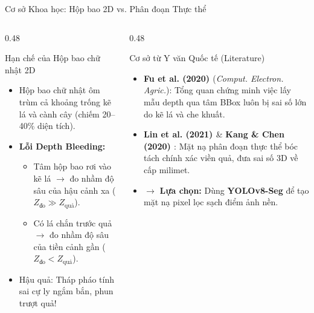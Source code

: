 \documentclass[aspectratio=169, 10pt]{beamer}
\begin{document}
\begin{frame}{Cơ sở Khoa học: Hộp bao 2D vs. Phân đoạn Thực thể}
\begin{columns}[T]
\begin{column}{0.48\textwidth}
    \begin{alertblock}{Hạn chế của Hộp bao chữ nhật 2D}
    \footnotesize
    \begin{itemize}
        \item Hộp bao chữ nhật ôm trùm cả khoảng trống kẽ lá và cành cây (chiếm 20--40\% diện tích).
        \item \textbf{Lỗi Depth Bleeding:} 
        \begin{itemize}
            \scriptsize
            \item Tâm hộp bao rơi vào kẽ lá $\rightarrow$ đo nhầm độ sâu của hậu cảnh xa ($Z_{\text{đo}} \gg Z_{\text{quả}}$).
            \item Có lá chắn trước quả $\rightarrow$ đo nhầm độ sâu của tiền cảnh gần ($Z_{\text{đo}} < Z_{\text{quả}}$).
        \end{itemize}
        \item Hậu quả: Tháp pháo tính sai cự ly ngắm bắn, phun trượt quả!
    \end{itemize}
    \end{alertblock}
\end{column}
\begin{column}{0.48\textwidth}
    \begin{exampleblock}{Cơ sở từ Y văn Quốc tế (Literature)}
    \footnotesize
    \begin{itemize}
        \item \textbf{Fu et al. (2020) \cite{fu2020rgbd}} (\textit{Comput. Electron. Agric.}): Tổng quan chứng minh việc lấy mẫu depth qua tâm BBox luôn bị sai số lớn do kẽ lá và che khuất.
        \item \textbf{Lin et al. (2021) \cite{lin2021fruit}} \& \textbf{Kang \& Chen (2020) \cite{kang2020dasnet}}: Mặt nạ phân đoạn thực thể bóc tách chính xác viền quả, đưa sai số 3D về cấp milimet.
        \item $\rightarrow$ \textbf{Lựa chọn:} Dùng \textbf{YOLOv8-Seg} để tạo mặt nạ pixel lọc sạch điểm ảnh nền.
    \end{itemize}
    \end{exampleblock}
\end{column}
\end{columns}
\end{frame}
\end{document}
